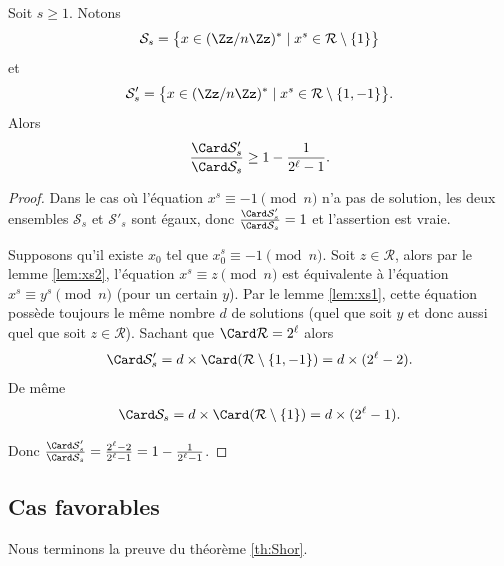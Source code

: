 \documentclass[11pt,class=report,crop=false]{standalone}
\begin{document}
\begin{lemme}
\label{lem:xs3}
Soit $s\ge1$.
Notons 
$$\mathcal{S}_s
= \big\{ x \in (\Zz/n\Zz)^*  \mid x^s \in \mathcal{R} \setminus \{1\} \big\}$$
et
$$\mathcal{S}_s'
= \big\{ x \in (\Zz/n\Zz)^* \mid x^s \in \mathcal{R} \setminus \{1,-1\} \big\}.$$
Alors
$$\frac{\Card \mathcal{S}_s'}{\Card \mathcal{S}_s} \ge 1-\frac{1}{2^\ell-1}.$$
\end{lemme}

\begin{proof}

Dans le cas où l'équation $x^s \equiv -1 \pmod n$ n'a pas de solution, les deux ensembles $\mathcal{S}_s$ et $\mathcal{S}'_s$ sont égaux, donc $\frac{\Card \mathcal{S}_s'}{\Card \mathcal{S}_s}=1$ et l'assertion est vraie.

Supposons qu'il  existe $x_0$ tel que $x_0^s \equiv -1 \pmod{n}$.
Soit $z \in \mathcal{R}$, alors par le lemme \ref{lem:xs2}, l'équation
$x^s \equiv z \pmod n$ est équivalente à l'équation $x^s \equiv y^s \pmod n$ (pour un certain $y$).
Par le lemme \ref{lem:xs1}, cette équation possède toujours le même nombre $d$ de solutions (quel que soit $y$ et donc aussi quel que soit $z \in \mathcal{R}$).
Sachant que $\Card \mathcal{R} = 2^\ell$ alors 
$$\Card  \mathcal{S}_s' = d \times \Card (\mathcal{R} \setminus \{1,-1\}) = d \times (2^\ell-2).$$
De même 
$$\Card \mathcal{S}_s = d \times \Card (\mathcal{R} \setminus \{1\}) = d \times (2^\ell-1).$$

Donc $\frac{\Card \mathcal{S}_s'}{\Card \mathcal{S}_s} = \frac{2^\ell-2}{2^\ell-1} = 1-\frac{1}{2^\ell-1}$.
\end{proof}

\subsection{Cas favorables}

Nous terminons la preuve du théorème \ref{th:Shor}.
\end{document}
